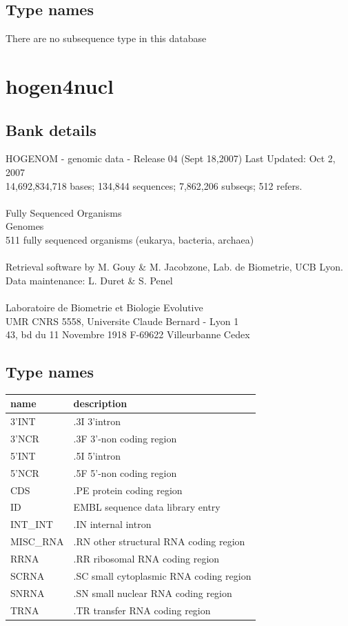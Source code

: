 \documentclass{article}
\begin{document}
\begin{Schunk}
\subsection{Type names}
There are no subsequence type in this database
\section{ hogen4nucl }
\subsection{Bank details}
HOGENOM - genomic data - Release 04 (Sept 18,2007) Last Updated: Oct  2, 2007\\
14,692,834,718 bases; 134,844 sequences; 7,862,206 subseqs; 512 refers.\\
\\
Fully Sequenced Organisms\\
Genomes\\
511 fully sequenced organisms (eukarya, bacteria, archaea)\\
\\
Retrieval software by M. Gouy \& M. Jacobzone, Lab. de Biometrie, UCB Lyon.\\
Data maintenance: L. Duret \& S. Penel\\
\\
Laboratoire de Biometrie et Biologie Evolutive\\
UMR CNRS 5558, Universite Claude Bernard - Lyon 1\\
43, bd du 11 Novembre 1918 F-69622 Villeurbanne Cedex\\


\subsection{Type names}
\noindent\begin{tabular}{ll}
\hline \hline
name & description\\
\hline
3'INT & .3I 3'intron \\
3'NCR & .3F  3'-non coding region \\
5'INT & .5I 5'intron \\
5'NCR & .5F  5'-non coding region \\
CDS & .PE protein coding region \\
ID & EMBL sequence data library entry \\
INT\_INT & .IN  internal intron \\
MISC\_RNA & .RN other structural RNA coding region \\
RRNA & .RR ribosomal RNA coding region \\
SCRNA & .SC small cytoplasmic RNA coding region \\
SNRNA & .SN small nuclear RNA coding region \\
TRNA & .TR transfer RNA coding region \\
\hline \hline
\end{tabular}


\end{Schunk}
\end{document}
